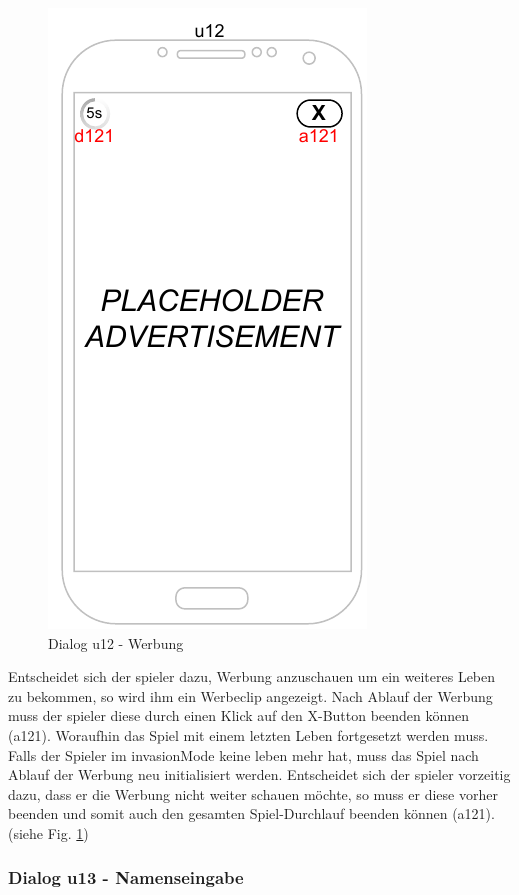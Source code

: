 \begin{figure}[h!]
    \begin{center}
    \includegraphics[scale=1.4]{diagramme/pdf/Mockup-u12.pdf}
    \end{center}
    \caption{Dialog u12 - Werbung}\label{fig:dia:u12}
\end{figure}


Entscheidet sich der \gls{spieler} dazu, Werbung anzuschauen um ein weiteres Leben zu bekommen, so wird ihm ein Werbeclip angezeigt.
Nach Ablauf der Werbung muss der \gls{spieler} diese durch einen Klick auf den X-Button beenden können (a121).
Woraufhin das Spiel mit einem letzten Leben fortgesetzt werden muss. Falls der Spieler im \gls{invasionMode} keine \gls{leben} mehr hat, muss das Spiel nach Ablauf der Werbung neu initialisiert werden. Entscheidet sich der \gls{spieler} vorzeitig dazu, dass er 
die Werbung nicht weiter schauen möchte, so muss er diese vorher beenden und somit auch den gesamten Spiel-Durchlauf beenden können (a121).
(siehe Fig. \ref{fig:dia:u12})
\clearpage

\subsubsection{Dialog u13 - Namenseingabe}\label{dialog:Namenseingabe}

